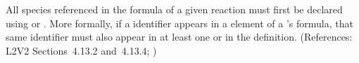 All species referenced in the \StoichiometryMath formula of a given
reaction must first be declared using \SpeciesReference or
\ModifierSpeciesReference.  More formally, if a \Species identifier appears
in a  element of a \Reaction's \StoichiometryMath formula, that
same identifier must also appear in at least one \SpeciesReference or
\ModifierSpeciesReference in the \Reaction definition.  (References: L2V2
Sections~4.13.2 and~4.13.4; )
